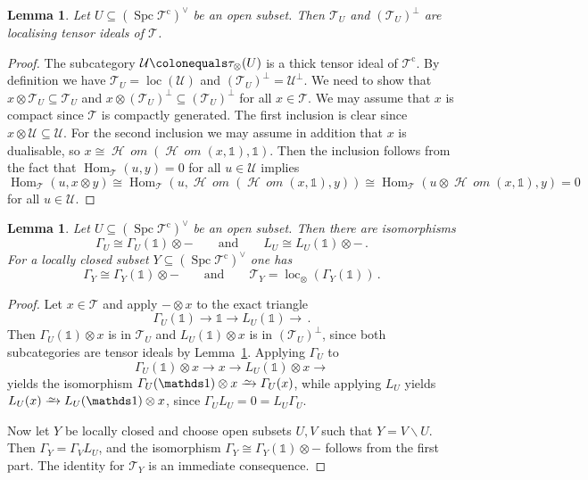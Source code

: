 \documentclass{amsart}[a4]
\newtheorem{lemma}[theorem]{Lemma}
\theoremstyle{definition}
\theoremstyle{remark}
\numberwithin{equation}{section}
\newcommand{\Hom}{\operatorname{Hom}}
\newcommand{\fHom}{\operatorname{\mathcal{H}\!\!\;\mathit{om}}}
\newcommand{\loc}{\operatorname{loc}}
\newcommand{\Spc}{\operatorname{Spc}}
\newcommand{\iso}{\xrightarrow{\raisebox{-.6ex}[0ex][0ex]{$\scriptstyle{\sim}$}}}
\newcommand{\lto}{\longrightarrow}
\newcommand{\cat}{\mathcal}
\newcommand{\one}{\mathds 1}
\let\Gamma\varGamma
\begin{document}
\begin{lemma}\label{le:tensor-ideal}
  Let $U\subseteq (\Spc\cat T^{\mathrm c})^\vee$ be an open subset. Then $\cat T_U$ and  $(\cat
  T_U)^\perp$ are localising tensor
  ideals of $\cat T$.
\end{lemma}
\begin{proof}
  The subcategory $\cat U\colonequals\tau_\otimes(U)$ is a thick
  tensor ideal of $\cat T^{\mathrm c}$. By definition we have
  $\cat T_U=\loc(\cat U)$ and $(\cat T_U)^\perp=\cat U^\perp$. We need
  to show that $x\otimes \cat T_U\subseteq \cat T_U$ and
  $x\otimes (\cat T_U)^\perp\subseteq (\cat T_U)^\perp$ for all
  $x\in\cat T$. We may assume that $x$ is compact since $\cat T$ is
  compactly generated. The first inclusion is clear since
  $x\otimes \cat U\subseteq \cat U$. For the second inclusion we may
  assume in addition that $x$ is dualisable, so $x\cong\fHom(\fHom(x,\one),\one)$.
  Then the inclusion
  follows from the fact that $\Hom_\cat T(u,y)=0$ for all $u\in\cat U$
  implies
  \[\Hom_\cat T(u,x\otimes y)\cong \Hom_\cat
    T(u,\fHom(\fHom(x,\one),y))\cong
    \Hom_\cat T(u\otimes\fHom(x,\one), y)=0\]
  for all $u\in\cat U$.
\end{proof}

\begin{lemma}\label{le:tensor-ideal-gamma}
  Let $U\subseteq (\Spc\cat T^{\mathrm c})^\vee$ be an open subset. Then there are isomorphisms
  \[\Gamma_U\cong\Gamma_U(\one)\otimes -\qquad\text{and}\qquad
    L_U\cong L_U(\one)\otimes -\,.\] For a locally closed subset
  $Y\subseteq (\Spc\cat T^{\mathrm c})^\vee$ one has
  \[ \Gamma_Y\cong\Gamma_Y(\one)\otimes -\qquad\text{and}\qquad \cat
    T_Y=\loc_\otimes(\Gamma_Y(\one)) \,.\]
\end{lemma}
\begin{proof}
  Let $x\in\cat T$ and apply $-\otimes x$ to the exact triangle
  \[\Gamma_U(\one)\lto\one\lto L_U(\one)\lto \,.\] Then
  $\Gamma_U(\one)\otimes x$ is in $\cat T_U$ and $L_U(\one)\otimes x$
  is in $(\cat T_U)^\perp$, since both subcategories are tensor ideals
  by Lemma~\ref{le:tensor-ideal}. Applying $\Gamma_U$ to
  \[\Gamma_U(\one) \otimes x\lto x\lto L_U(\one) \otimes x\lto\]
  yields the
  isomorphism $\Gamma_U(\one)\otimes x\iso\Gamma_U(x)$, while applying
  $L_U$ yields $L_U(x)\iso L_U(\one)\otimes x$, since
  $\Gamma_U L_U=0=L_U\Gamma_U$.

Now let $Y$ be locally closed and choose open subsets $U,V$ such that
  $Y=V\smallsetminus U$. Then $\Gamma_Y=\Gamma_VL_U$, and the
  isomorphism  $\Gamma_Y\cong\Gamma_Y(\one)\otimes -$ follows from the
  first part.  The identity for $\cat T_Y$ is an immediate consequence.
\end{proof}
\end{document}

